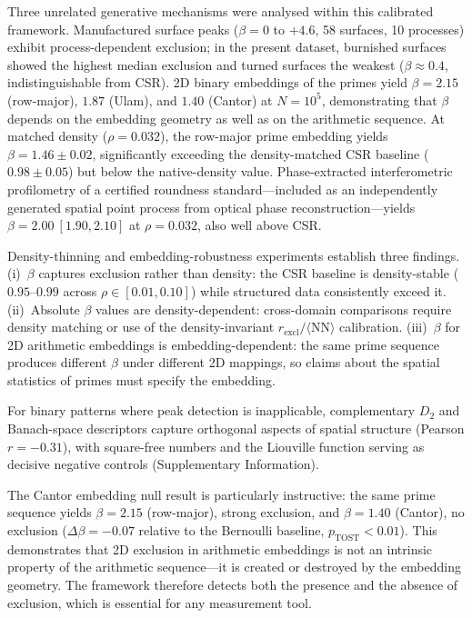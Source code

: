 \documentclass[final,1p,times]{elsarticle}
\theoremstyle{definition}
\begin{document}
Three unrelated generative mechanisms were analysed within this calibrated
framework. Manufactured surface peaks ($\beta = 0$ to $+4.6$, 58 surfaces,
10 processes) exhibit process-dependent exclusion; in the present dataset,
burnished surfaces showed the highest median exclusion and turned surfaces
the weakest ($\beta \approx 0.4$, indistinguishable from CSR).
2D binary embeddings of the primes yield $\beta = 2.15$ (row-major),
$1.87$ (Ulam), and $1.40$ (Cantor) at $N=10^5$, demonstrating that
$\beta$ depends on the embedding geometry as well as on the arithmetic
sequence. At matched density ($\rho = 0.032$), the row-major prime
embedding yields $\beta = 1.46\pm0.02$, significantly exceeding the
density-matched CSR baseline ($0.98\pm0.05$) but below the native-density
value. Phase-extracted interferometric profilometry of a certified roundness
standard---included as an independently generated spatial point process from
optical phase reconstruction---yields $\beta = 2.00~[1.90,2.10]$ at
$\rho = 0.032$, also well above CSR.

Density-thinning and embedding-robustness experiments establish three
findings. (i)~$\beta$ captures exclusion rather than density: the CSR
baseline is density-stable ($0.95$--$0.99$ across $\rho \in [0.01, 0.10]$)
while structured data consistently exceed it. (ii)~Absolute $\beta$ values
are density-dependent: cross-domain comparisons require density matching or
use of the density-invariant $r_{\text{excl}}/\langle\text{NN}\rangle$
calibration. (iii)~$\beta$ for 2D arithmetic embeddings is
embedding-dependent: the same prime sequence produces different $\beta$
under different 2D mappings, so claims about the spatial statistics of
primes must specify the embedding.

For binary patterns where peak detection is inapplicable, complementary $D_2$
and Banach-space descriptors capture orthogonal aspects of spatial structure
(Pearson $r = -0.31$), with square-free numbers and the Liouville function
serving as decisive negative controls (Supplementary Information).

The Cantor embedding null result is particularly instructive:
the same prime sequence yields $\beta=2.15$ (row-major), strong
exclusion, and $\beta=1.40$ (Cantor), no exclusion
($\Delta\beta=-0.07$ relative to the Bernoulli baseline,
$p_{\text{TOST}}<0.01$). This demonstrates that 2D exclusion in
arithmetic embeddings is not an intrinsic property of the arithmetic
sequence---it is created or destroyed by the embedding geometry. The
framework therefore detects both the presence and the absence of
exclusion, which is essential for any measurement tool.
\end{document}
